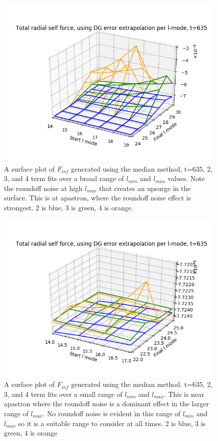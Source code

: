 \begin{figure}
  \includegraphics{bestfinflminlmax234terms635fullrange_perihelion}
  \caption{A surface plot of $F_{inf}$ generated using the median method, t=635, 2, 3, and 4 term fits over a broad range of $l_{min}$ and $l_{max}$ values. Note the roundoff noise at high $l_{max}$ that creates an upsurge in the surface. This is at apastron, where the roundoff noise effect is strongest. 2 is blue, 3 is green, 4 is orange.}
  \label{surface234big}
\end{figure}

\begin{figure}
  \includegraphics{bestfinflminlmax234termst635smallrange_perihelion}
  \caption{A surface plot of $F_{inf}$ generated using the median method. t=635, 2, 3, and 4 term fits over a small range of $l_{min}$ and $l_{max}$. This is near apastron where the roundoff noise is a dominant effect in the larger range of $l_{max}$.  No roundoff noise is evident in this range of $l_{min}$ and $l_{max}$ so it is a suitable range to consider at all times. 2 is blue, 3 is green, 4 is orange}
  \label{surface234small}
\end{figure}



